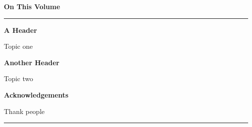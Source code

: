 \clearpage
\thispagestyle{frontmatter}

\vspace*{0.5cm}

\begin{center}
  {\LARGE\bfseries\color{cmjcrimson}On This Volume}\label{art:volume}
\end{center}

\vspace{0.3cm}
\noindent\textcolor{cmjgold}{\rule{\textwidth}{1.2pt}}
\vspace{0.3cm}


      {\large\bfseries\color{cmjcrimson}A Header}

      \vspace{0.3cm}

      Topic one
      
      \vspace{0.3cm}

      {\large\bfseries\color{cmjcrimson}Another Header}
  
      \vspace{0.3cm}

      Topic two
      
      \vspace{0.3cm}

  {\large\bfseries\color{cmjcrimson}Acknowledgements}

    \vspace{0.3cm}

    Thank people
    
\vspace{0.15cm}

\noindent\textcolor{cmjgold}{\rule{\textwidth}{1.2pt}}

\vspace{0.6cm}
\newpage